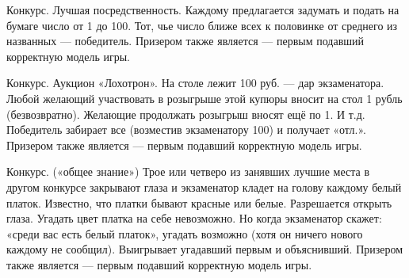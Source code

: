 \begin{problem}
Конкурс. Лучшая посредственность. Каждому предлагается задумать и подать на
бумаге число от 1 до 100. Тот, чье число ближе всех
к половинке от среднего из названных — победитель.
Призером также является — первым подавший
корректную модель игры.



\begin{sol}

\end{sol}
\end{problem}




\begin{problem}
 Конкурс. Аукцион «Лохотрон». На столе лежит 100 руб. — дар
экзаменатора. Любой желающий участвовать в
розыгрыше этой купюры вносит на стол 1 рубль
(безвозвратно). Желающие продолжать розыгрыш вносят
ещё по 1. И т.д. Победитель забирает все (возместив
экзаменатору 100) и получает «отл.». Призером также
является — первым подавший корректную модель игры.



\begin{sol}

\end{sol}
\end{problem}



\begin{problem}
 Конкурс. («общее знание») Трое или четверо из
занявших лучшие места в другом конкурсе закрывают
глаза и экзаменатор кладет на голову каждому белый
платок. Известно, что платки бывают красные или
белые. Разрешается открыть глаза. Угадать цвет
платка на себе невозможно. Но когда экзаменатор
скажет: «среди вас есть белый платок», угадать
возможно (хотя он ничего нового каждому не
сообщил). Выигрывает угадавший первым и объяснивший.
Призером также является — первым подавший
корректную модель игры.



\begin{sol}

\end{sol}
\end{problem}
